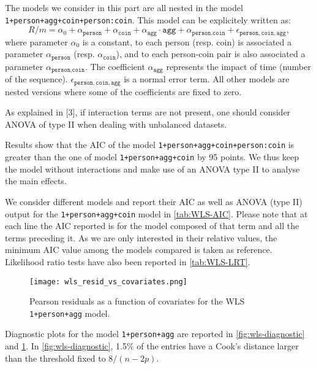 \documentclass[a4paper, 12pt,oneside]{article}
\begin{document}
			The models we consider in this part are all nested in the model \texttt{1+person+agg+coin+person:coin}.
			This model can be explicitely written as: 
			\begin{equation}
				\label{eq:wls_model}
				R/m = \alpha_0 + \alpha_{\texttt{person}}+\alpha_{\texttt{coin}} +\alpha_{\texttt{agg}}\cdot\texttt{agg} +\alpha_{\texttt{person},\texttt{coin}} + \epsilon_{\texttt{person},\texttt{coin},\texttt{agg}},
			\end{equation}
			where parameter $\alpha_0$ is a constant, to each person (resp. coin) is associated a parameter
			$\alpha_{\texttt{person}}$ (resp. $\alpha_{\texttt{coin}}$), and to each person-coin pair is also associated a parameter $\alpha_{\texttt{person},\texttt{coin}}$. The coefficient $\alpha_{\texttt{agg}}$ represents the impact of time (number of the sequence). $\epsilon_{\texttt{person},\texttt{coin},\texttt{agg}}$ is a normal error term. All other models are nested versions where some of the coefficients are fixed to zero.
			
			As explained in [3], if interaction terms are not present, one should consider ANOVA of type II when dealing with unbalanced datasets.

			Results show that the AIC of the model \texttt{1+person+agg+coin+person:coin} is greater than the one of model \texttt{1+person+agg+coin} by 95 points. We thus keep the model without interactions and make use of an ANOVA type II to analyse the main effects. 

			We consider different models and report their AIC as well as  ANOVA (type II) output for the \texttt{1+person+agg+coin} model in \ref{tab:WLS-AIC}. Please note that at each line the AIC reported is for the model composed of that term and all the terms preceding it. As we are only interested in their relative values, the minimum AIC value among the models compared is taken as reference. 
			Likelihood ratio tests have also been reported in \ref{tab:WLS-LRT}.
			\begin{figure}[htb]
				\vspace{-1em}
				\centering
				\texttt{[image: wls\_resid\_vs\_covariates.png]}
				\caption{Pearson residuals as a function of covariates for the WLS \texttt{1+person+agg} model.}
				\label{fig:wls-diagnostic-time-coefs}
			\end{figure}

			Diagnostic plots for the model \texttt{1+person+agg} are reported in \ref{fig:wls-diagnostic} and \ref{fig:wls-diagnostic-time-coefs}. In \ref{fig:wls-diagnostic}, 1.5\% of the entries have a Cook's distance larger than the threshold fixed to $8/(n-2p)$. 
\end{document}
